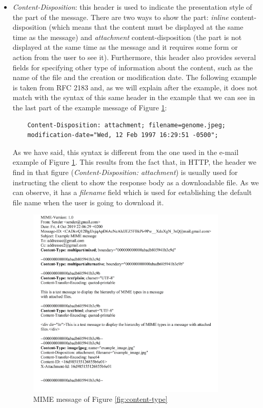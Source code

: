 \begin{itemize}
	\item\textit{Content-Disposition}: this header is used to indicate the presentation style of the part of the message. There are two ways to show the part: \textit{inline} content-disposition (which means that the content must be displayed at the same time as the message) and \textit{attachment} content-disposition (the part is not displayed at the same time as the message and it requires some form or action from the user to see it). Furthermore, this header also provides several fields for specifying other type of information about the content, such as the name of the file and the creation or modification date. The following example is taken from RFC 2183 \citep{rfc2183} and, as we will explain after the example, it does not match with the syntax of this same header in the example that we can see in the last part of the example message of Figure \ref{fig:examplemime}:
	\begin{lstlisting}
	Content-Disposition: attachment; filename=genome.jpeg;
	modification-date="Wed, 12 Feb 1997 16:29:51 -0500";
	\end{lstlisting}
	As we have said, this syntax is different from the one used in the e-mail example of Figure \ref{fig:examplemime}. This results from the fact that, in HTTP, the header we find in that figure (\textit{Content-Disposition: attachment}) is usually used for instructing the client to show the response body as a downloadable file. As we can observe, it has a \textit{filename} field which is used for establishing the default file name when the user is going to download it.
	
	\begin{figure}[t]
		\centering%
		\centerline{\includegraphics[width = 0.9\textwidth]{Imagenes/Bitmap/exampleMime.png}}%
		\caption{MIME message of Figure \ref{fig:content-type}}%
		\label{fig:examplemime}
	\end{figure}
	

\end{itemize}
